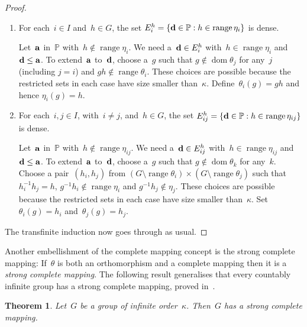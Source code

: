 \documentclass[12pt,a4paper]{article}
\newtheorem{thm}{Theorem}[section]
\DeclareMathOperator{\dom}{dom}
\DeclareMathOperator{\ran}{range}
\renewcommand{\P}{\mathbb{P}}
\begin{document}
\begin{proof}
\begin{enumerate}
\item For each~$i \in I$ and~$h \in G$, the set $E_i^h = \{ {\bf d} \in \P : h \in \ran \eta_i \}$ is dense.

Let~${\bf a}$ in~$\P$ with~$h \not\in \ran \eta_i$.  We need a~${\bf d} \in E_i^h$ with~$h \in \ran \eta_i$ and ${\bf d} \leq {\bf a}$.  To extend~${\bf a}$ to~${\bf d}$, choose a~$g$ such that $g \not\in \dom \theta_j$ for any~$j$ (including $j=i$) and $gh \not\in \ran \theta_i$.  These choices are possible because the restricted sets in each case have size smaller than~$\kappa$.  Define~$\theta_i(g) = gh$  and hence $\eta_i(g) = h$.   


\item For each~$i,j \in I$, with~$i \neq j$, and~$h \in G$, the set $E_{ij}^h = \{ {\bf d} \in \P : h \in \ran \eta_{ij} \}$ is dense.

Let~${\bf a}$ in~$\P$ with~$h \not\in \ran \eta_{ij}$.  We need a~${\bf d} \in E_{ij}^h$ with~$h \in \ran \eta_{ij}$ and ${\bf d} \leq {\bf a}$.  To extend~${\bf a}$ to~${\bf d}$, choose a~$g$ such that $g \not\in \dom \theta_k$ for any~$k$.   Choose a pair~$(h_i,h_j)$ from $(G \setminus \ran \theta_i) \times (G \setminus \ran \theta_j)$ such that~$h_i^{-1}h_j = h$, $g^{-1}h_i \not\in \ran \eta_i$ and $g^{-1}h_j \not\in \eta_j$. These choices are possible because the restricted sets in each case have size smaller than~$\kappa$.
 Set~$\theta_i(g) = h_i$ and~$\theta_j(g) = h_j$.


\end{enumerate}

The transfinite induction now goes through as usual.
\end{proof}












Another embellishment of the complete mapping concept is the strong complete mapping:
If~$\theta$ is both an orthomorphism and a complete mapping then it is a {\em strong complete mapping}.  The following result generalises that every countably infinite group has a strong complete mapping, proved in~\cite{Evans12}.

\begin{thm}
Let~$G$ be a group of infinite order~$\kappa$.  Then~$G$ has a strong complete mapping.
\end{thm}
\end{document}
